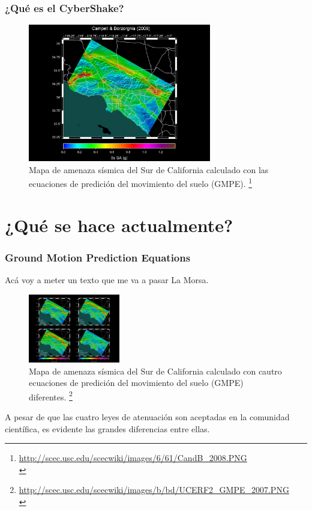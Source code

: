 \documentclass{beamer}
\begin{document}
\begin{frame}
\frametitle{¿Qué es el CyberShake?}
%
\begin{figure}[h]
	\centering
	\includegraphics[height=6cm]{img/CandB_2008.PNG}
	\caption{Mapa de amenaza sísmica del Sur de California calculado con las ecuaciones de predición del movimiento del suelo (GMPE). \footnote{\url{http://scec.usc.edu/scecwiki/images/6/61/CandB_2008.PNG}\\}}
\end{figure}
%
%
%
\end{frame}
%
%
\section{¿Qué se hace actualmente?}
\begin{frame}[allowframebreaks]\frametitle{Ground Motion Prediction Equations}
%
Acá voy a meter un texto que me va a pasar La Morsa.
%
%
\begin{figure}[h]
	\centering
	\includegraphics[height=3cm]{img/UCERF2_GMPE_2007.PNG}
	\caption{Mapa de amenaza sísmica del Sur de California calculado con cautro ecuaciones de predición del movimiento del suelo (GMPE) diferentes. \footnote{\url{http://scec.usc.edu/scecwiki/images/b/bd/UCERF2_GMPE_2007.PNG}\\}}
\end{figure}
%
A pesar de que las cuatro leyes de atenuación son aceptadas en la comunidad científica, es evidente las grandes diferencias entre ellas.
%
\end{frame}
%
%
\end{document}
